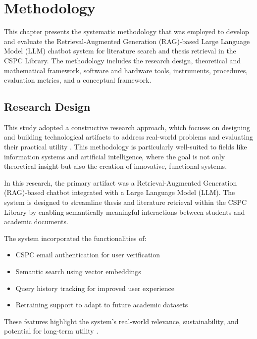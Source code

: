 
\chapter{Methodology}
\begin{refsection}
 
This chapter presents the systematic methodology that was employed to develop and evaluate the Retrieval-Augmented Generation (RAG)-based Large Language Model (LLM) chatbot system for literature search and thesis retrieval in the CSPC Library. The methodology includes the research design, theoretical and mathematical framework, software and hardware tools, instruments, procedures, evaluation metrics, and a conceptual framework.

\section{Research Design}

This study adopted a constructive research approach, which focuses on designing and building technological artifacts to address real-world problems and evaluating their practical utility \citeauthor{lukka2003cons} \citeyear{lukka2003cons}. This methodology is particularly well-suited to fields like information systems and artificial intelligence, where the goal is not only theoretical insight but also the creation of innovative, functional systems.

In this research, the primary artifact was a Retrieval-Augmented Generation (RAG)-based chatbot integrated with a Large Language Model (LLM). The system is designed to streamline thesis and literature retrieval within the CSPC Library by enabling semantically meaningful interactions between students and academic documents.

The system incorporated the functionalities of:

\begin{itemize}
    \item CSPC email authentication for user verification
    \item Semantic search using vector embeddings
    \item Query history tracking for improved user experience
    \item Retraining support to adapt to future academic datasets
\end{itemize}


These features highlight the system's real-world relevance, sustainability, and potential for long-term utility \cite{hevner2004design}.


\end{refsection}
